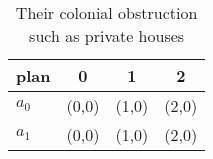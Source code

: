 \documentclass[a4paper]{article}
\begin{document}
\begin{table}
\begin{adjustbox}{width=0.6\columnwidth}
\begin{tabular}{|l|l|l|l|}
\hline
\textbf{plan} & \multicolumn{1}{c|}{\textbf{0}} & \multicolumn{1}{c|}{\textbf{1}} & \multicolumn{1}{c|}{\textbf{2}} \\ \hline
\textbf{$a_0$}  & (0,0) & (1,0) & (2,0) \\ \hline
\textbf{$a_1$}  & (0,0) & (1,0) & (2,0) \\ \hline
\end{tabular}
\end{adjustbox}
\caption{Their colonial obstruction such as private houses
}
\end{table}
\end{document}
